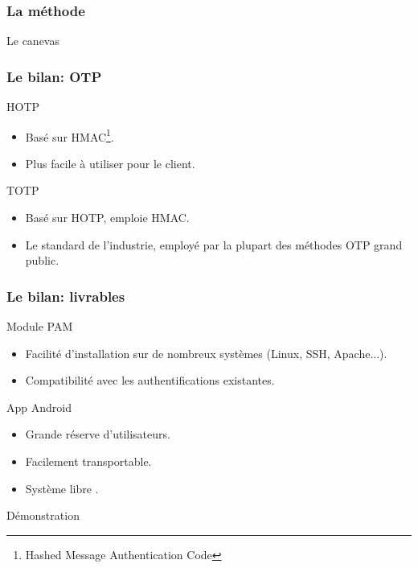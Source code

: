 \documentclass[xcolor=table]{beamer}
\begin{document}
\begin{frame}
\frametitle{La méthode}
\begin{block}{Le canevas}

\end{block}
\end{frame}

\begin{frame}
\frametitle{Le bilan: OTP}
\begin{block}{HOTP}
\begin{itemize}
\item Basé sur HMAC\footnote{Hashed Message Authentication Code}.
\item Plus facile à utiliser pour le client.
\end{itemize}
\end{block}

\begin{block}{TOTP}
\begin{itemize}
\item Basé sur HOTP, emploie HMAC.
\item Le standard de l'industrie, employé par la plupart des méthodes OTP grand public.
\end{itemize}

\end{block}
\end{frame}


\begin{frame}
\frametitle{Le bilan: livrables}
\begin{block}{Module PAM}
\begin{itemize}
\item Facilité d'installation sur de nombreux systèmes (Linux, SSH, Apache...).
\item Compatibilité avec les authentifications existantes.
\end{itemize}
\end{block}

\begin{block}{App Android}
\begin{itemize}
\item Grande réserve d'utilisateurs.
\item Facilement transportable.
\item Système \og libre \fg{}. 
\end{itemize}
\end{block} 
\end{frame}

\begin{frame}
\begin{center}
\Huge{Démonstration}
\end{center}
\end{frame}
\end{document}
